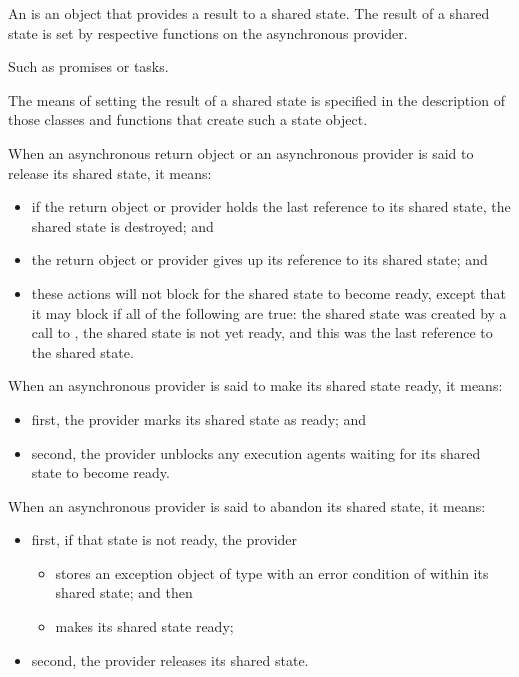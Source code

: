 \pnum
An  is an object that provides a result to a shared
state.
The result of a shared state is set by
respective functions on the asynchronous provider. \begin{note} Such as promises or tasks.
\end{note} The means of setting the result of a shared state is specified
in the description of those classes and functions that create such a state object.

\pnum
When an asynchronous return object or an asynchronous provider is said to release its
shared state, it means:

\begin{itemize}
\item
if the return object or provider holds the last reference to its shared state,
the shared state is destroyed; and

\item
the return object or provider gives up its reference to its shared state; and

\item these actions will not block for the shared state to become ready, except that it
may block if all of the following are true: the shared state was created by a call to
, the shared state is not yet ready, and this was the last reference
to the shared state.
\end{itemize}

\pnum
When an asynchronous provider is said to make its shared state ready, it means:

\begin{itemize}
\item
first, the provider marks its shared state as ready; and

\item
second, the provider unblocks any execution agents waiting for its shared
state to become ready.
\end{itemize}

\pnum
When an asynchronous provider is said to abandon its shared state, it means:

\begin{itemize}
\item
first, if that state is not ready, the provider

\begin{itemize}
\item
stores an exception object of type  with an error condition of
 within its shared state; and then

\item
makes its shared state ready;
\end{itemize}

\item
second, the provider releases its shared state.
\end{itemize}

